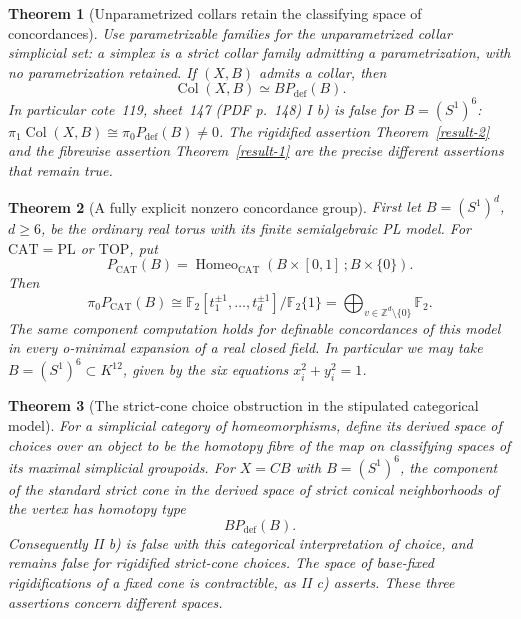 \documentclass[11pt,a4paper]{article}
\newtheorem{theorem}{Theorem}[section]
\theoremstyle{definition}
\newcommand{\Z}{\mathbb Z}
\newcommand{\F}{\mathbb F}
\DeclareMathOperator{\Homeo}{Homeo}
\begin{document}
\begin{theorem}[Unparametrized collars retain the classifying space of concordances]\label{result-7}
Use parametrizable families for the unparametrized collar simplicial set:
a simplex is a strict collar family admitting a parametrization, with no
parametrization retained. If $(X,B)$ admits a collar, then
\[
 \operatorname{Col}(X,B)\simeq BP_{\mathrm{def}}(B).
\]
In particular cote~119, sheet~147 (PDF p.~148) I b) is false for $B=(S^1)^6$:
$\pi_1\operatorname{Col}(X,B)\cong\pi_0P_{\mathrm{def}}(B)\ne0$.
The rigidified assertion Theorem~\ref{result-2} and the fibrewise assertion Theorem~\ref{result-1} are
the precise different assertions that remain true.
\end{theorem}

\begin{theorem}[A fully explicit nonzero concordance group]\label{result-3}
First let $B=(S^1)^d$, $d\geq6$, be the ordinary real torus with
its finite semialgebraic PL model. For $\mathrm{CAT}=\mathrm{PL}$ or
$\mathrm{TOP}$, put
\[
 P_{\mathrm{CAT}}(B)=
 \Homeo_{\mathrm{CAT}}(B\times[0,1]\,;B\times\{0\}).
\]
Then
\[
 \pi_0P_{\mathrm{CAT}}(B)
 \cong \F_2[t_1^{\pm1},\ldots,t_d^{\pm1}]/\F_2\{1\}
 =\bigoplus_{v\in\Z^d\setminus\{0\}}\F_2.
\]
The same component computation holds for definable concordances of this
model in every o-minimal expansion of a real closed field. In particular
we may take $B=(S^1)^6\subset K^{12}$, given by the six equations
$x_i^2+y_i^2=1$.
\end{theorem}

\begin{theorem}[The strict-cone choice obstruction in the stipulated categorical model]\label{result-12}
For a simplicial category of homeomorphisms, define its derived space
of choices over an object to be the homotopy fibre of the map on
classifying spaces of its maximal simplicial groupoids. For
$X=C B$ with $B=(S^1)^6$, the component of the standard strict cone
in the derived space of strict conical neighborhoods of the vertex
has homotopy type
\[
 BP_{\mathrm{def}}(B).
\]
Consequently II b) is false with this categorical interpretation of
choice, and remains false for rigidified strict-cone choices. The
space of base-fixed rigidifications of a \emph{fixed} cone is contractible, as
II c) asserts. These three assertions concern different spaces.
\end{theorem}
\end{document}
